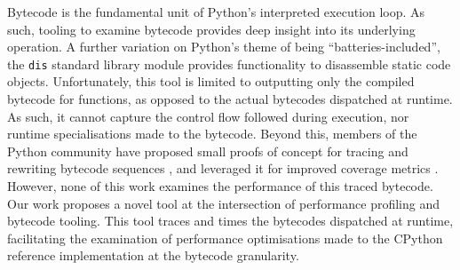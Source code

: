 Bytecode is the fundamental unit of Python's interpreted execution loop. As such, tooling to examine bytecode provides deep insight into its underlying operation.
A further variation on Python's theme of being ``batteries-included'', the \texttt{dis} standard library module provides functionality to disassemble static code objects. Unfortunately, this tool is limited to outputting only the compiled bytecode for functions, as opposed to the actual bytecodes dispatched at runtime. As such, it cannot capture the control flow followed during execution, nor runtime specialisations made to the bytecode.
Beyond this, members of the Python community have proposed small proofs of concept for tracing and rewriting bytecode sequences \cite{0xecCodingReversingHacking2017} \cite{clementrouaultUnderstandingPythonExecution}, and leveraged it for improved coverage metrics \cite{nedbatchelderWickedHackPython2008}.
However, none of this work examines the performance of this traced bytecode.
Our work proposes a novel tool at the intersection of performance profiling and bytecode tooling.
This tool traces and times the bytecodes dispatched at runtime, facilitating the examination of performance optimisations made to the CPython reference implementation at the bytecode granularity.

